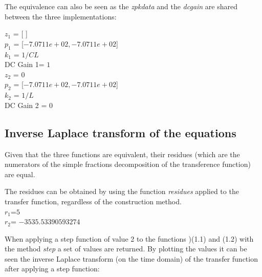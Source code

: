 \documentclass[a4paper,12pt]{article}
\begin{document}
\vspace{0.5cm}

The equivalence can also be seen as the \textit{zpkdata} and the \textit{dcgain} are shared between the three implementations:

\vspace{0.5cm}

{\centering
$z_1$ = [ ] \\ 
$p_1$ = [$-7.0711e+02, -7.0711e+02$] \\
$k_1$ = $1/CL$\\
DC Gain 1= $1$\\
$z_2$ = $0$ \\
$p_2$ = [$-7.0711e+02, -7.0711e+02$] \\
$k_2$ = $1/L$\\
DC Gain 2 = $0$
}
\newpage

\subsection{Inverse Laplace transform of the equations}

\vspace{0.5cm}

Given that the three functions are equivalent, their residues (which are the numerators of the simple fractions decomposition of the transference function) are equal. 

The residues can be obtained by using the function \textit{residues} applied to the transfer function, regardless of the construction method. \\

{\centering
$r_1$=$5$ \\
$r_2$= $-3535.53390593274$\\
}

\vspace{0.5cm}
When applying a step function of value 2 to the functions )(1.1) and (1.2) with the method \textit{step} a set of values are returned. By plotting the values it can be seen the inverse Laplace transform (on the time domain) of the transfer function after applying a step function:

\vspace{0.5cm}
\end{document}
